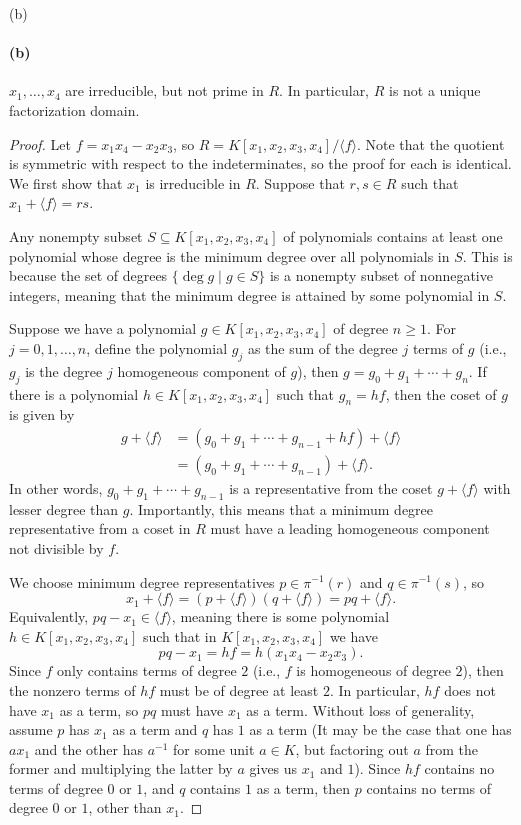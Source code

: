 \documentclass[12pt]{article}
\newenvironment{fullbox}{\begin{lrbox}{\savefullbox}\begin{minipage}{\dimexpr\textwidth-2\fboxsep\relax}}{\end{minipage}\end{lrbox}\begin{center}\framebox[\textwidth]{\usebox{\savefullbox}}\end{center}}
\newenvironment{pbox}[1][]{\begin{fullbox}\ifx#1\empty\else\paragraph{#1}\fi}{\end{fullbox}}
\theoremstyle{definition}
\newcommand{\<}{\langle}
\renewcommand{\>}{\rangle}
\begin{document}
\begin{pbox}[(b)]
    $x_1, \dots, x_4$ are irreducible, but not prime in $R$. In particular, $R$ is not a unique factorization domain.
\end{pbox}

\begin{proof}
    Let $f = x_1x_4 - x_2x_3$, so $R = K[x_1, x_2, x_3, x_4]/\<f\>$. Note that the quotient is symmetric with respect to the indeterminates, so the proof for each is identical. We first show that $x_1$ is irreducible in $R$. Suppose that $r, s \in R$ such that $x_1 + \<f\> = rs$. 

    Any nonempty subset $S \subseteq K[x_1, x_2, x_3, x_4]$ of polynomials contains at least one polynomial whose degree is the minimum degree over all polynomials in $S$. This is because the set of degrees $\{\deg g \mid g \in S\}$ is a nonempty subset of nonnegative integers, meaning that the minimum degree is attained by some polynomial in $S$.

    Suppose we have a polynomial $g \in K[x_1, x_2, x_3, x_4]$ of degree $n \geq 1$. For $j = 0, 1, \dots, n$, define the polynomial $g_j$ as the sum of the degree $j$ terms of $g$ (i.e., $g_j$ is the degree $j$ homogeneous component of $g$), then $g = g_0 + g_1 + \cdots + g_n$. If there is a polynomial $h \in K[x_1, x_2, x_3, x_4]$ such that $g_n = hf$, then the coset of $g$ is given by
    \begin{align*}
        g + \<f\> 
            &= (g_0 + g_1 + \cdots + g_{n-1} + hf) + \<f\> \\
            &= (g_0 + g_1 + \cdots + g_{n-1}) + \<f\>.
    \end{align*}
    In other words, $g_0 + g_1 + \cdots + g_{n-1}$ is a representative from the coset $g + \<f\>$ with lesser degree than $g$. Importantly, this means that a minimum degree representative from a coset in $R$ must have a leading homogeneous component not divisible by $f$.
    
    We choose minimum degree representatives $p \in \pi^{-1}(r)$ and $q \in \pi^{-1}(s)$, so
    \[
        x_1 + \<f\> = (p + \<f\>)(q + \<f\>) = pq + \<f\>.
    \]
    Equivalently, $pq - x_1 \in \<f\>$, meaning there is some polynomial $h \in K[x_1, x_2, x_3, x_4]$ such that in $K[x_1, x_2, x_3, x_4]$ we have
    \[
        pq - x_1 = hf = h(x_1x_4 - x_2x_3).
    \]
    Since $f$ only contains terms of degree $2$ (i.e., $f$ is homogeneous of degree $2$), then the nonzero terms of $hf$ must be of degree at least $2$. In particular, $hf$ does not have $x_1$ as a term, so $pq$ must have $x_1$ as a term. Without loss of generality, assume $p$ has $x_1$ as a term and $q$ has $1$ as a term (It may be the case that one has $ax_1$ and the other has $a^{-1}$ for some unit $a \in K$, but factoring out $a$ from the former and multiplying the latter by $a$ gives us $x_1$ and $1$). Since $hf$ contains no terms of degree $0$ or $1$, and $q$ contains $1$ as a term, then $p$ contains no terms of degree $0$ or $1$, other than $x_1$. 
    

\end{proof}
\end{document}
